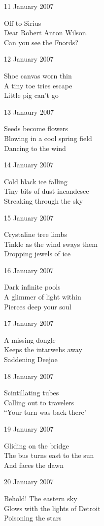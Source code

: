 \documentclass[12pt]{article}
\begin{document}
11 January 2007

Off to Sirius \\
Dear Robert Anton Wilson. \\
Can you see the Fnords?

12 January 2007

Shoe canvas worn thin \\
A tiny toe tries escape \\
Little pig can't go

13 Janaury 2007

Seeds become flowers \\
Blowing in a cool spring field \\
Dancing to the wind


\newpage

14 January 2007

Cold black ice falling \\
Tiny bits of dust incandesce \\
Streaking through the sky

15 January 2007

Crystaline tree limbs \\
Tinkle as the wind sways them \\
Dropping jewels of ice

16 January 2007

Dark infinite pools \\
A glimmer of light within \\
Pierces deep your soul

17 January 2007

A missing dongle \\
Keeps the intarwebs away \\
Saddening Deejoe

18 January 2007

Scintillating tubes \\
Calling out to travelers \\
``Your turn was back there"

19 January 2007

Gliding on the bridge \\
The bus turns east to the sun \\
And faces the dawn


\newpage

20 January 2007

Behold! The eastern sky \\
Glows with the lights of Detroit \\
Poisoning the stars
\end{document}
